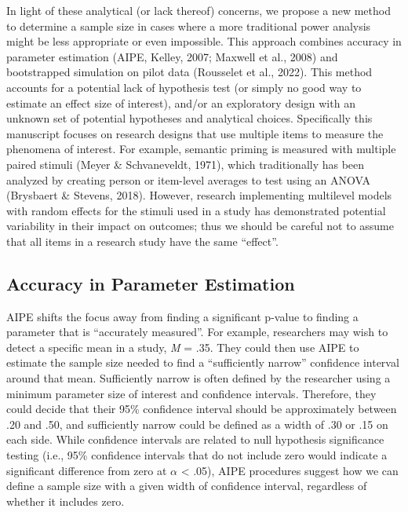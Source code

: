 \documentclass[
  man]{apa7}
\begin{document}
In light of these analytical (or lack thereof) concerns, we propose a new method to determine a sample size in cases where a more traditional power analysis might be less appropriate or even impossible. This approach combines accuracy in parameter estimation (AIPE, Kelley, 2007; Maxwell et al., 2008) and bootstrapped simulation on pilot data (Rousselet et al., 2022). This method accounts for a potential lack of hypothesis test (or simply no good way to estimate an effect size of interest), and/or an exploratory design with an unknown set of potential hypotheses and analytical choices. Specifically this manuscript focuses on research designs that use multiple items to measure the phenomena of interest. For example, semantic priming is measured with multiple paired stimuli (Meyer \& Schvaneveldt, 1971), which traditionally has been analyzed by creating person or item-level averages to test using an ANOVA (Brysbaert \& Stevens, 2018). However, research implementing multilevel models with random effects for the stimuli used in a study has demonstrated potential variability in their impact on outcomes; thus we should be careful not to assume that all items in a research study have the same ``effect''.

\hypertarget{accuracy-in-parameter-estimation}{%
\subsection{Accuracy in Parameter Estimation}\label{accuracy-in-parameter-estimation}}

AIPE shifts the focus away from finding a significant p-value to finding a parameter that is ``accurately measured''. For example, researchers may wish to detect a specific mean in a study, \emph{M} = .35. They could then use AIPE to estimate the sample size needed to find a ``sufficiently narrow'' confidence interval around that mean. Sufficiently narrow is often defined by the researcher using a minimum parameter size of interest and confidence intervals. Therefore, they could decide that their 95\% confidence interval should be approximately between .20 and .50, and sufficiently narrow could be defined as a width of .30 or .15 on each side. While confidence intervals are related to null hypothesis significance testing (i.e., 95\% confidence intervals that do not include zero would indicate a significant difference from zero at \(\alpha\) \textless{} .05), AIPE procedures suggest how we can define a sample size with a given width of confidence interval, regardless of whether it includes zero.
\end{document}
